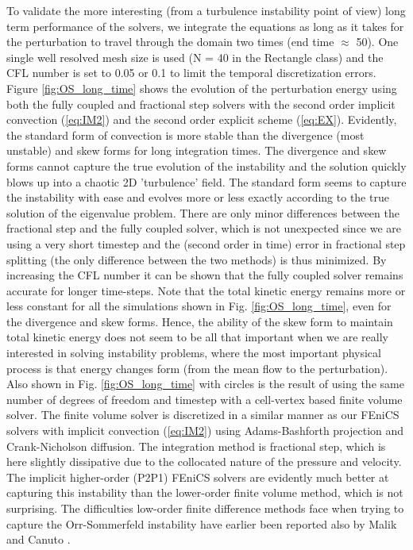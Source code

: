 To validate the more interesting (from a turbulence instability point of view) long term performance of the solvers, we integrate the equations as long as it takes for the perturbation to travel through the domain two times (end time $\approx$ 50). One single well resolved mesh size is used (N = 40 in the Rectangle class) and the CFL number is set to 0.05 or 0.1 to limit the temporal discretization errors. Figure \ref{fig:OS_long_time} shows the evolution of the perturbation energy using both the fully coupled and fractional step solvers with the second order implicit convection (\ref{eq:IM2}) and the second order explicit scheme (\ref{eq:EX}). Evidently, the standard form of convection is more stable than the divergence (most unstable) and skew forms for long integration times. The divergence and skew forms cannot capture the true evolution of the instability and the solution quickly blows up into a chaotic 2D 'turbulence' field. The standard form seems to capture the instability with ease and evolves more or less exactly according to the true solution of the eigenvalue problem. There are only minor differences between the fractional step and the fully coupled solver, which is not unexpected since we are using a very short timestep and the (second order in time) error in fractional step splitting (the only difference between the two methods) is thus minimized. By increasing the CFL number it can be shown that the fully coupled solver remains accurate for longer time-steps. Note that the total kinetic energy remains more or less constant for all the simulations shown in Fig. \ref{fig:OS_long_time}, even for the divergence and skew forms. Hence, the ability of the skew form to maintain total kinetic energy does not seem to be all that important when we are really interested in solving instability problems, where the most important physical process is that energy changes form (from the mean flow to the perturbation). Also shown in Fig. \ref{fig:OS_long_time} with circles is the result of using the same number of degrees of freedom and timestep with a cell-vertex based finite volume solver. The finite volume solver is discretized in a similar manner as our FEniCS solvers with implicit convection (\ref{eq:IM2}) using Adams-Bashforth projection and Crank-Nicholson diffusion. The integration method is fractional step, which is here slightly dissipative due to the collocated nature of the pressure and velocity. The implicit higher-order (P2P1) FEniCS solvers are evidently much better at capturing this instability than the lower-order finite volume method, which is not surprising. The difficulties low-order finite difference methods face when trying to capture the Orr-Sommerfeld instability have earlier been reported also by Malik \cite{Malik1984} and Canuto \cite{canuto07}.
